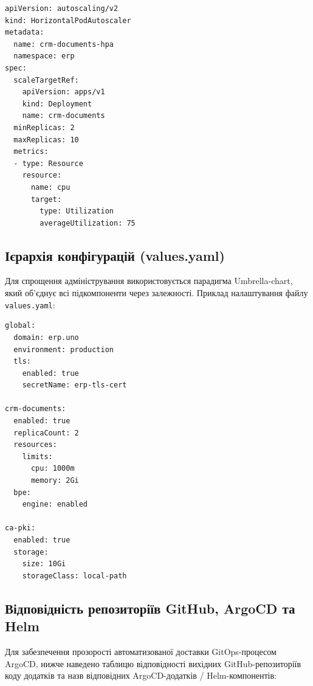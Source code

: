 \begin{lstlisting}
apiVersion: autoscaling/v2
kind: HorizontalPodAutoscaler
metadata:
  name: crm-documents-hpa
  namespace: erp
spec:
  scaleTargetRef:
    apiVersion: apps/v1
    kind: Deployment
    name: crm-documents
  minReplicas: 2
  maxReplicas: 10
  metrics:
  - type: Resource
    resource:
      name: cpu
      target:
        type: Utilization
        averageUtilization: 75
\end{lstlisting}

\subsection{Ієрархія конфігурацій (values.yaml)}
Для спрощення адміністрування використовується парадигма Umbrella-chart, який об'єднує всі підкомпоненти через залежності. Приклад налаштування файлу \texttt{values.yaml}:
\begin{lstlisting}
global:
  domain: erp.uno
  environment: production
  tls:
    enabled: true
    secretName: erp-tls-cert

crm-documents:
  enabled: true
  replicaCount: 2
  resources:
    limits:
      cpu: 1000m
      memory: 2Gi
  bpe:
    engine: enabled

ca-pki:
  enabled: true
  storage:
    size: 10Gi
    storageClass: local-path
\end{lstlisting}

\subsection{Відповідність репозиторіїв GitHub, ArgoCD та Helm}
 
Для забезпечення прозорості автоматизованої доставки GitOps-процесом ArgoCD, нижче наведено таблицю відповідності вихідних GitHub-репозиторіїв коду додатків та назв відповідних ArgoCD-додатків / Helm-компонентів:

